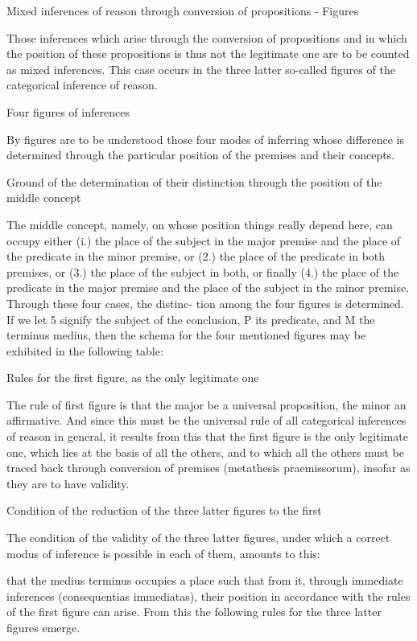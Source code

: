 Mixed inferences of reason through conversion of
propositions - Figures

Those inferences which arise through the conversion of propositions and
in which the position of these propositions is thus not the legitimate one
are to be counted as mixed inferences. This case occurs in the three latter
so-called figures of the categorical inference of reason.

Four figures of inferences

By figures are to be understood those four modes of inferring whose
difference is determined through the particular position of the premises
and their concepts.

Ground of the determination of their distinction
through the position of the middle concept

The middle concept, namely, on whose position things really depend
here, can occupy either (i.) the place of the subject in the major premise
and the place of the predicate in the minor premise, or (2.) the place of the
predicate in both premises, or (3.) the place of the subject in both, or
finally (4.) the place of the predicate in the major premise and the place of
the subject in the minor premise. Through these four cases, the distinc-
tion among the four figures is determined. If we let 5 signify the subject of
the conclusion, P its predicate, and M the terminus medius, then the
schema for the four mentioned figures may be exhibited in the following
table:

Rules for the first figure, as the only legitimate one

The rule of first figure is that
the major be a universal proposition,
the minor an affirmative.
And since this must be the universal rule of
all categorical inferences of reason in general,
it results from this that the first figure is the only legitimate one,
which lies at the basis of all the others,
and to which all the others must be traced back
through conversion of premises (metathesis praemissorum),
insofar as they are to have validity.

Condition of the reduction of the three latter figures to the first

The condition of the validity of the three latter figures,
under which a correct modus of inference is possible in each of them,
amounts to this:

that the medius terminus occupies a place such that from it,
through immediate inferences (consequentias immediatas),
their position in accordance with the rules of the first figure can arise.
From this the following rules for the three latter figures emerge.

